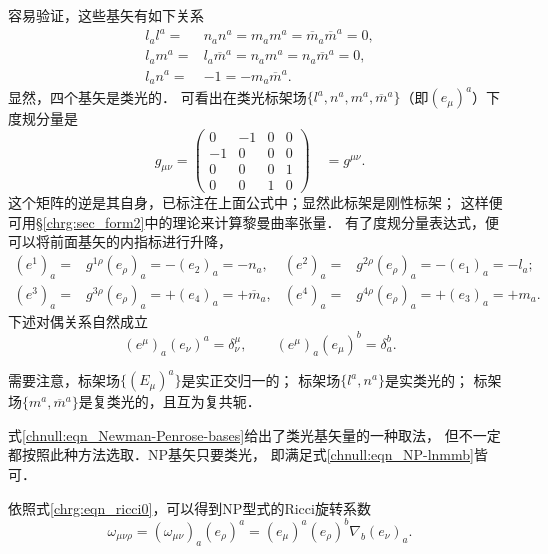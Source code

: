 容易验证，这些基矢有如下关系
\begin{subequations}\label{chnull:eqn_NP-lnmmb}
    \begin{align}
        l_a l^a =& n_a n^a = m_a m^a = \overline{m}_a \overline{m}^a = 0 , \\
        l_a m^a =& l_a \overline{m}^a = n_a m^a = n_a \overline{m}^a = 0 , \\
        l_a n^a =& -1 = - m_a  \overline{m}^a  .\label{chnull:eqn_lm1}
    \end{align}
\end{subequations}
显然，四个基矢是{\kaishu 类光}的．
可看出在类光标架场$\{l^a, n^a, m^a, \overline{m}^a\}$（即$(e_\mu)^a$）下
度规分量是
\begin{equation}\label{chnull:eqn_np-metric}
    g_{\mu \nu } = \left( {\begin{array}{*{20}{c}}
            0&-1&0&0\\
            -1&0&0&0\\
            0&0&0&1\\
            0&0&1&0
    \end{array}} \right)
    \quad = g^{\mu \nu } .
\end{equation}
这个矩阵的逆是其自身，已标注在上面公式中；显然此标架是{\heiti 刚性标架}；
这样便可用\S\ref{chrg:sec_form2}中的理论来计算黎曼曲率张量．
有了度规分量表达式，便可以将前面基矢的内指标进行升降，
\begin{align*}
        (e^1)_a =& g^{1\rho}(e_\rho)_a=-(e_2)_a=-n_a, &
        (e^2)_a =& g^{2\rho}(e_\rho)_a=-(e_1)_a=-l_a;  \\
        (e^3)_a =& g^{3\rho}(e_\rho)_a=+(e_4)_a=+\overline{m}_a, &
        (e^4)_a =& g^{4\rho}(e_\rho)_a=+(e_3)_a=+{m}_a .
\end{align*}
下述对偶关系自然成立
\begin{equation}
    (e^\mu)_a (e_\nu)^a = \delta_\nu^\mu, \qquad
    (e^\mu)_a (e_\mu)^b = \delta_a^b .
\end{equation}

需要注意，标架场$\{(E_\mu)^a\}$是{\kaishu 实}正交归一的；
标架场$\{l^a, n^a\}$是{\kaishu 实}类光的；
标架场$\{m^a, \overline{m}^a\}$是{\kaishu 复}类光的，且互为复共轭．
\begin{remark}
    式\eqref{chnull:eqn_Newman-Penrose-bases}给出了类光基矢量的一种取法，
    但不一定都按照此种方法选取．NP基矢只要类光，
    即满足式\eqref{chnull:eqn_NP-lnmmb}皆可．
\end{remark}

依照式\eqref{chrg:eqn_ricci0}，可以得到NP型式的Ricci旋转系数
\begin{equation}\label{chnull:eqn_NP-spin-coef}
    \omega_{\mu\nu\rho}= (\omega_{\mu\nu})_a(e_\rho)^a
    = (e_\mu)^a (e_\rho)^b \nabla_b (e_\nu)_a .
\end{equation}

